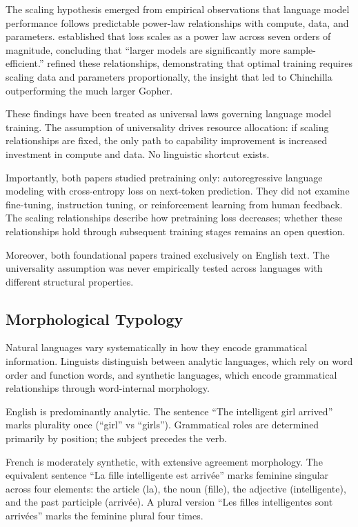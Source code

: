 \documentclass[11pt,a4paper]{article}
\begin{document}
The scaling hypothesis emerged from empirical observations that language model performance follows predictable power-law relationships with compute, data, and parameters. \citet{kaplan2020scaling} established that loss scales as a power law across seven orders of magnitude, concluding that ``larger models are significantly more sample-efficient.'' \citet{hoffmann2022training} refined these relationships, demonstrating that optimal training requires scaling data and parameters proportionally, the insight that led to Chinchilla outperforming the much larger Gopher.

These findings have been treated as universal laws governing language model training. The assumption of universality drives resource allocation: if scaling relationships are fixed, the only path to capability improvement is increased investment in compute and data. No linguistic shortcut exists.

Importantly, both papers studied pretraining only: autoregressive language modeling with cross-entropy loss on next-token prediction. They did not examine fine-tuning, instruction tuning, or reinforcement learning from human feedback. The scaling relationships describe how pretraining loss decreases; whether these relationships hold through subsequent training stages remains an open question.

Moreover, both foundational papers trained exclusively on English text. The universality assumption was never empirically tested across languages with different structural properties.

\subsection{Morphological Typology}

Natural languages vary systematically in how they encode grammatical information. Linguists distinguish between analytic languages, which rely on word order and function words, and synthetic languages, which encode grammatical relationships through word-internal morphology.

English is predominantly analytic. The sentence ``The intelligent girl arrived'' marks plurality once (``girl'' vs ``girls''). Grammatical roles are determined primarily by position; the subject precedes the verb.

French is moderately synthetic, with extensive agreement morphology. The equivalent sentence ``La fille intelligente est arriv\'{e}e'' marks feminine singular across four elements: the article (la), the noun (fille), the adjective (intelligente), and the past participle (arriv\'{e}e). A plural version ``Les filles intelligentes sont arriv\'{e}es'' marks the feminine plural four times.
\end{document}
